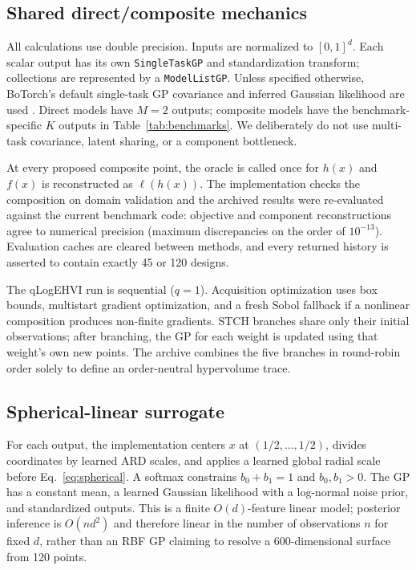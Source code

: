 \documentclass{article}
\newcommand{\composemap}{\ell}
\begin{document}
\subsection{Shared direct/composite mechanics}

All calculations use double precision.  Inputs are normalized to $[0,1]^d$.
Each scalar output has its own \texttt{SingleTaskGP} and standardization
transform; collections are represented by a \texttt{ModelListGP}.  Unless
specified otherwise, BoTorch's default single-task GP covariance and inferred
Gaussian likelihood are used \cite{balandat2020botorch}.  Direct models have
$M=2$ outputs; composite models have the benchmark-specific $K$ outputs in
Table~\ref{tab:benchmarks}.  We deliberately do not use multi-task covariance,
latent sharing, or a component bottleneck.

At every proposed composite point, the oracle is called once for $h(x)$ and
$f(x)$ is reconstructed as $\composemap(h(x))$.  The implementation checks the
composition on domain validation and the archived results were re-evaluated
against the current benchmark code: objective and component reconstructions
agree to numerical precision (maximum discrepancies on the order of
$10^{-13}$).  Evaluation caches are cleared between methods, and every returned
history is asserted to contain exactly 45 or 120 designs.

The qLogEHVI run is sequential ($q=1$).  Acquisition optimization uses box
bounds, multistart gradient optimization, and a fresh Sobol fallback if a
nonlinear composition produces non-finite gradients.  STCH branches share only
their initial observations; after branching, the GP for each weight is updated
using that weight's own new points.  The archive combines the five branches in
round-robin order solely to define an order-neutral hypervolume trace.

\subsection{Spherical-linear surrogate}

For each output, the implementation centers $x$ at $(1/2,\ldots,1/2)$, divides
coordinates by learned ARD scales, and applies a learned global radial scale
before Eq.~\eqref{eq:spherical}.  A softmax constrains $b_0+b_1=1$ and
$b_0,b_1>0$.  The GP has a constant mean, a learned Gaussian likelihood with a
log-normal noise prior, and standardized outputs.  This is a finite
$O(d)$-feature linear model; posterior inference is $O(nd^2)$ and therefore
linear in the number of observations $n$ for fixed $d$, rather than an RBF GP
claiming to resolve a 600-dimensional surface from 120 points.
\end{document}
